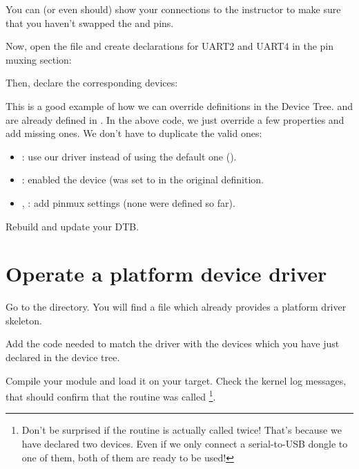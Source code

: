You can (or even should) show your connections to the instructor
to make sure that you haven't swapped the  and  pins. 

Now, open the 
file and create declarations for UART2 and UART4 in the pin muxing
section:

{\small {}}

Then, declare the corresponding devices:


This is a good example of how we can override definitions in the Device
Tree.  and  are already defined in 
. In the above code, we just
override a few properties and add missing ones. We don't have to 
duplicate the valid ones:

\begin{itemize}
\item {}: use our driver instead of using the default one
      (). 
\item {}: enabled the device (was set to  in
      the original definition.
\item {}, : add pinmux settings
      (none were defined so far).
\end{itemize}

Rebuild and update your DTB.

\section{Operate a platform device driver}

Go to the  directory.
You will find a  file which already provides a platform
driver skeleton.

Add the code needed to match the driver with the devices which you have
just declared in the device tree.

Compile your module and load it on your target. Check the kernel log
messages, that should confirm that the  routine was
called \footnote{Don't be surprised if the  routine is
actually called twice! That's because we have declared two devices.
Even if we only connect a serial-to-USB dongle to one of them, both
of them are ready to be used!}.

